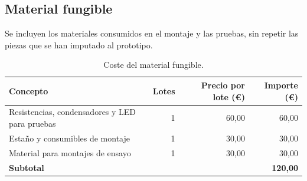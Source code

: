 \begin{samepage}
  \subsection{Material fungible}
  \label{sec:presupuesto-material}

  Se incluyen los materiales consumidos en el montaje y las pruebas, sin
  repetir las piezas que se han imputado al prototipo.

  \nopagebreak
  \begin{table}[H]
    \caption{Coste del material fungible.}
    \label{tab:presupuesto-fungible}
    \begin{tabularx}{\linewidth}{@{}>{\raggedright\arraybackslash}X r r r@{}}
      \hline
      \textbf{Concepto}                              & \textbf{Lotes} & \textbf{Precio por lote (€)} & \textbf{Importe (€)} \\
      \hline
      Resistencias, condensadores y LED para pruebas &              1 &                        60,00 &                60,00 \\
      Estaño y consumibles de montaje                &              1 &                        30,00 &                30,00 \\
      Material para montajes de ensayo               &              1 &                        30,00 &                30,00 \\
      \hline
      \textbf{Subtotal}                              &                &                              &      \textbf{120,00} \\
      \hline
    \end{tabularx}
  \end{table}
\end{samepage}
\pagebreak[0]

